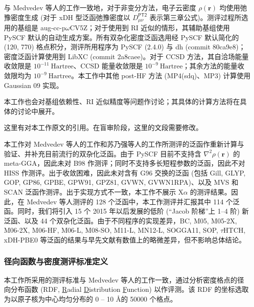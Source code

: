 与 Medvedev 等人的工作\cite{Medvedev-Lyssenko.S.2017}一致地，对于非变分方法，电子云密度 $\rho (\bm{r})$ 均使用弛豫密度生成 (对于 xDH 型泛函弛豫密度以 $D_{\mu \nu}^\textsf{PT2}$ 表示\alert{第三章公式})。测评过程所选用的基组是 aug-cc-p$\omega$CV5Z\cite{Dunning-Dunning.JCP.1989, Kendall-Harrison.JCP.1992, Peterson-Dunning.JCP.2002}；对于使用到 RI 近似的情形，其辅助基组使用 PySCF 默认的自动生成方案\cite{Stoychev-Neese.JCTC.2017}。所有双杂化密度泛函选用经 PySCF 默认简化的 (120, 770) 格点积分，测评所用程序为 PySCF (2.4.0)\cite{Sun-Chan.WCMS.2018, Sun-Chan.JCP.2020} 与 dh (commit 80ca9e8)；密度泛函计算使用到 LibXC (commit 2a8caee)。对于 CCSD 方法，其自洽场能量收敛限是 $10^{-11} \ \text{Hartree}$、CCSD 能量收敛限是 $10^{-9} \ \text{Hartree}$；其余方法的能量收敛限均为 $10^{-9} \ \text{Hartree}$。本工作中其他 post-HF 方法 (MP4(sdq)、MP3) 计算使用 Gaussian 09 实现\cite{Gaussian09, Su-Xu.PNAS.2018}。

本工作也会对基组依赖性、RI 近似精度等问题作讨论；其具体的计算方法将在具体的讨论中展开。

\alert{这里有对本工作原文的引用。在盲审阶段，这里的文段需要修改。}

本工作对 Medvedev 等人的工作\cite{Medvedev-Lyssenko.S.2017}和苏乃强等人的工作\cite{Su-Xu.PNAS.2018}所测评的泛函作重新计算与验证、并补充目前流行的双杂化泛函。由于 PySCF 目前不支持含 $\nabla^2 \rho(\bm{r})$ 的 meta-GGA，因此未对 B98 作测评；同时不支持多长短程参数的泛函，因此不对 HISS 作测评。出于收敛困难，因此未对含有 G96 交换的泛函 (包括 Gill, GLYP, GOP, GP86, GPBE, GPW91, GPZ81, GVWN, GVWN1RPA)、以及 MVS 和 SCAN 泛函作测评。出于实现方式不一致，本工作不展示 X$\alpha$ 的测评结果。因此，在 Medvedev 等人测评的 128 个泛函中，本工作测评并汇报其中 114 个泛函。同时，我们将引入 15 个 2015 年以后发展的低阶 (“Jacob 阶梯”上 1--4 阶) 新泛函、以及 44 个双杂化泛函。由于不同程序的实现差异，BC, M05, M05-2X, M06-2X, M06-HF, M06-L, M08-SO, M11-L, MN12-L, SOGGA11, SOP, $\tau$HTCH, xDH-PBE0 等泛函的结果与早先文献有数值上的略微差异，但不影响总体结论。

\subsubsection{径向函数与密度测评标准定义}

本工作所采用的测评标准与 Medvedev 等人的工作\cite{Medvedev-Lyssenko.S.2017}一致，通过分析密度格点的径向分布函数 (RDF, \underline{R}adial \underline{D}istribution \underline{F}unction) 以作评测。该 RDF 的坐标选取为以原子核为中心均匀分布的 0 -- 10 \AA 的 50000 个格点。

